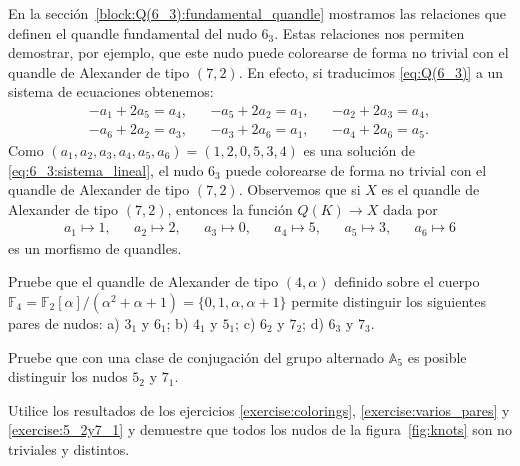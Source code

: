 \documentclass[graybox]{svmult}
\newcommand{\F}{\mathbb{F}}
\newcommand{\Alt}{\mathbb{A}}
\begin{document}
\begin{example}
	\label{exa:6_3}
	En la sección~\ref{block:Q(6_3):fundamental_quandle} mostramos las relaciones que
	definen el quandle fundamental del nudo $6_3$. Estas relaciones nos
	permiten demostrar, por ejemplo, que este nudo puede colorearse de forma no
	trivial con el quandle de Alexander de tipo $(7,2)$. En efecto, si
	traducimos
	\eqref{eq:Q(6_3)} a un sistema de ecuaciones obtenemos:
    \begin{equation}
        \label{eq:6_3:sistema_lineal}
        \begin{aligned}
            -a_1+2a_5=a_4, && -a_5+2a_2=a_1, && -a_2+2a_3=a_4,\\
            -a_6+2a_2=a_3, && -a_3+2a_6=a_1, && -a_4+2a_6=a_5.
        \end{aligned}
    \end{equation}
	Como $(a_1,a_2,a_3,a_4,a_5,a_6)=(1,2,0,5,3,4)$ es una solución de
	\eqref{eq:6_3:sistema_lineal}, el nudo $6_3$ puede colorearse de forma no
	trivial con el quandle de Alexander de tipo $(7,2)$. Observemos que si $X$
	es el quandle de Alexander de tipo $(7,2)$, entonces la función $Q(K)\to X$ dada por 
    \begin{align*}
        a_1\mapsto 1, && 
        a_2\mapsto 2, &&
        a_3\mapsto 0, &&
        a_4\mapsto 5, &&
        a_5\mapsto 3, &&
        a_6\mapsto 6
    \end{align*}
    es un morfismo de quandles.
\end{example}

\begin{exercise}
    \label{exercise:varios_pares}
		Pruebe que el quandle de Alexander de tipo $(4,\alpha)$ definido sobre
		el cuerpo
		$\F_4=\F_2[\alpha]/(\alpha^2+\alpha+1)=\{0,1,\alpha,\alpha+1\}$ permite
		distinguir los siguientes pares de nudos: a) $3_1$ y $6_1$; b) $4_1$ y
$5_1$; c) $6_2$ y $7_2$; d) $6_3$ y $7_3$.
\end{exercise}

\begin{exercise}
    \label{exercise:5_2y7_1}
	Pruebe que con una clase de conjugación del grupo alternado $\Alt_5$ es
	posible distinguir los nudos $5_2$ y $7_1$. 
\end{exercise}

\begin{exercise}
    Utilice los resultados de los ejercicios \ref{exercise:colorings},
    \ref{exercise:varios_pares} y \ref{exercise:5_2y7_1} y demuestre que todos los nudos
    de la figura~\ref{fig:knots} son no triviales y distintos.
\end{exercise}
\end{document}
